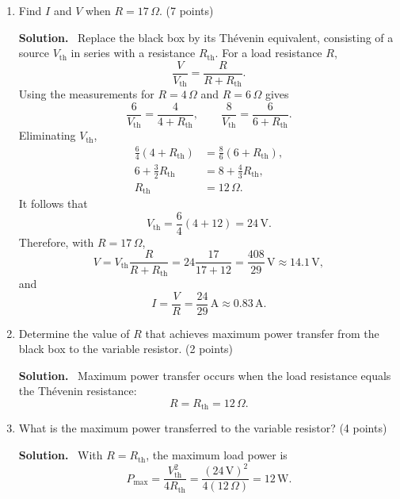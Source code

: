 \documentclass[11pt]{article}
\newenvironment{solution}
  {\par\medskip\noindent\textbf{Solution.}\ }
  {\par\medskip}
\begin{document}
\begin{enumerate}[label=(\alph*), leftmargin=2em]
  \item Find $I$ and $V$ when $R=17\,\Omega$. \hfill (7 points)

  \begin{solution}
  Replace the black box by its Th\'evenin equivalent, consisting of a source
  $V_{\mathrm{th}}$ in series with a resistance $R_{\mathrm{th}}$. For a load
  resistance $R$,
  \[
    \frac{V}{V_{\mathrm{th}}}=\frac{R}{R+R_{\mathrm{th}}}.
  \]
  Using the measurements for $R=4\,\Omega$ and $R=6\,\Omega$ gives
  \[
    \frac{6}{V_{\mathrm{th}}}=\frac{4}{4+R_{\mathrm{th}}},
    \qquad
    \frac{8}{V_{\mathrm{th}}}=\frac{6}{6+R_{\mathrm{th}}}.
  \]
  Eliminating $V_{\mathrm{th}}$,
  \begin{align*}
    \frac{6}{4}(4+R_{\mathrm{th}})
      &= \frac{8}{6}(6+R_{\mathrm{th}}),\\
    6+\frac{3}{2}R_{\mathrm{th}}
      &= 8+\frac{4}{3}R_{\mathrm{th}},\\
    R_{\mathrm{th}} &= 12\,\Omega.
  \end{align*}
  It follows that
  \[
    V_{\mathrm{th}}
      =\frac{6}{4}(4+12)
      =24\,\mathrm{V}.
  \]
  Therefore, with $R=17\,\Omega$,
  \[
    V=V_{\mathrm{th}}\frac{R}{R+R_{\mathrm{th}}}
      =24\frac{17}{17+12}
      =\frac{408}{29}\,\mathrm{V}
      \approx 14.1\,\mathrm{V},
  \]
  and
  \[
    I=\frac{V}{R}
      =\frac{24}{29}\,\mathrm{A}
      \approx 0.83\,\mathrm{A}.
  \]
  \end{solution}

  \item Determine the value of $R$ that achieves maximum power transfer from
  the black box to the variable resistor. \hfill (2 points)

  \begin{solution}
  Maximum power transfer occurs when the load resistance equals the Th\'evenin
  resistance:
  \[
    \boxed{R=R_{\mathrm{th}}=12\,\Omega.}
  \]
  \end{solution}

  \item What is the maximum power transferred to the variable resistor?
  \hfill (4 points)

  \begin{solution}
  With $R=R_{\mathrm{th}}$, the maximum load power is
  \[
    P_{\max}=\frac{V_{\mathrm{th}}^2}{4R_{\mathrm{th}}}
      =\frac{(24\,\mathrm{V})^2}{4(12\,\Omega)}
      =\boxed{12\,\mathrm{W}}.
  \]
  \end{solution}
\end{enumerate}
\end{document}
